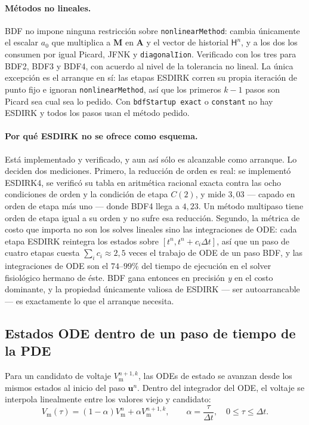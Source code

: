 \documentclass[11pt,a4paper]{article}
\newcommand{\code}[1]{\texttt{\small #1}}
\newcommand{\Vm}{V_{\text{m}}}
\newcommand{\Mmass}{\mathbf{M}}
\newcommand{\Aimp}{\mathbf{A}}
\begin{document}
\paragraph{Métodos no lineales.} BDF no impone ninguna restricción sobre
\code{nonlinearMethod}: cambia únicamente el escalar $a_0$ que multiplica a $\Mmass$ en
$\Aimp$ y el vector de historial $\mathsf{H}^n$, y a los dos los consumen por igual Picard,
JFNK y \code{diagonalIion}. Verificado con los tres para BDF2, BDF3 y BDF4, con acuerdo al
nivel de la tolerancia no lineal. La única excepción es el arranque en sí: las etapas ESDIRK
corren su propia iteración de punto fijo e ignoran \code{nonlinearMethod}, así que los
primeros $k-1$ pasos son Picard sea cual sea lo pedido. Con \code{bdfStartup exact} o
\code{constant} no hay ESDIRK y todos los pasos usan el método pedido.

\paragraph{Por qué ESDIRK no se ofrece como esquema.} Está implementado y verificado, y aun
así sólo es alcanzable como arranque. Lo deciden dos mediciones. Primero, la reducción de
orden es real: se implementó ESDIRK4, se verificó su tabla en aritmética racional exacta
contra las ocho condiciones de orden y la condición de etapa $C(2)$, y mide $3{,}03$ ---
capado en orden de etapa más uno --- donde BDF4 llega a $4{,}23$. Un método multipaso tiene
orden de etapa igual a su orden y no sufre esa reducción. Segundo, la métrica de costo que
importa no son los solves lineales sino las integraciones de ODE: cada etapa ESDIRK
reintegra los estados sobre $[t^n,t^n+c_i\Delta t]$, así que un paso de cuatro etapas cuesta
$\sum_i c_i\approx2{,}5$ veces el trabajo de ODE de un paso BDF, y las integraciones de ODE
son el $74$--$99\%$ del tiempo de ejecución en el solver fisiológico hermano de éste. BDF
gana entonces en precisión \emph{y} en el costo dominante, y la propiedad únicamente valiosa
de ESDIRK --- ser autoarrancable --- es exactamente lo que el arranque necesita.

\subsection{Estados ODE dentro de un paso de tiempo de la PDE}

Para un candidato de voltaje $\Vm^{n+1,k}$, las ODEs de estado se avanzan desde los mismos
estados al inicio del paso $\mathbf{u}^n$. Dentro del integrador del ODE, el voltaje se
interpola linealmente entre los valores viejo y candidato:
\begin{equation}
  \Vm(\tau)
  =
  (1-\alpha)\Vm^n+\alpha \Vm^{n+1,k},
  \qquad
  \alpha=\frac{\tau}{\Delta t},\quad 0\le \tau\le \Delta t.
  \label{eq:ode-vm-interpolation}
\end{equation}
\end{document}
